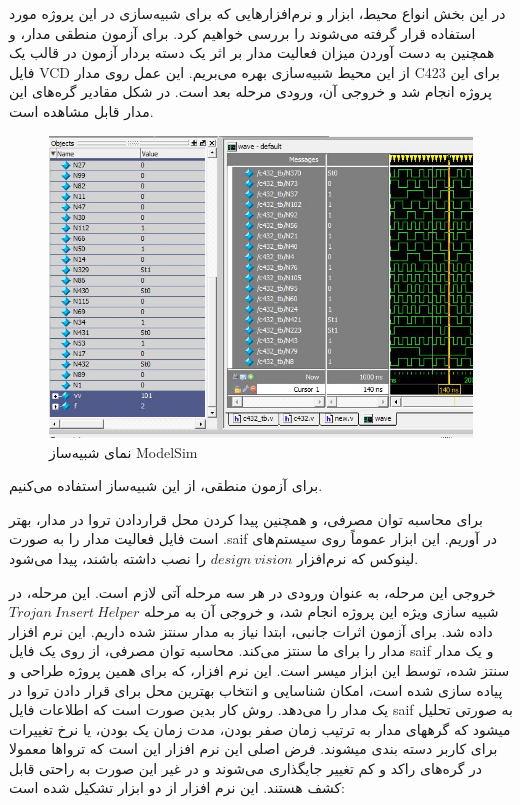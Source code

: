 در این بخش انواع محیط، ابزار و نرم‌افزارهایی که برای شبیه‌سازی در این پروژه مورد استفاده قرار گرفته می‌شوند را بررسی خواهیم کرد.
برای آزمون منطقی مدار، و همچنین به دست آوردن میزان فعالیت مدار بر اثر یک دسته بردار آزمون در قالب یک فایل VCD از این محیط شبیه‌سازی بهره می‌بریم. این عمل روی مدار C423 برای این پروژه انجام شد و خروجی آن، ورودی مرحله بعد است. در شکل مقادیر گره‌های این مدار قابل مشاهده است.
\begin{figure}[H]
\begin{center}
\includegraphics[scale=0.6]{figs/modelsim.jpg}
\caption{نمای شبیه‌ساز ModelSim} 
\label{fig1}
\end{center}
\end{figure}
برای آزمون منطقی، از این شبیه‌ساز استفاده می‌کنیم.

برای محاسبه توان مصرفی، و همچنین پیدا کردن محل قراردادن تروا در مدار، بهتر است فایل فعالیت مدار را به صورت .saif در آوریم. این ابزار عموماً روی سیستم‌های لینوکس که نرم‌افزار  $design\ vision$ را نصب داشته باشند، پیدا می‌شود.

 خروجی این مرحله، به عنوان ورودی در هر سه مرحله آتی لازم است. این مرحله، در شبیه سازی ویژه این پروژه انجام شد، و خروجی آن به مرحله $Trojan\ Insert\ Helper$ داده شد.
برای آزمون اثرات جانبی، ابتدا نیاز به مدار سنتز شده داریم. این نرم افزار مدار را برای ما سنتز می‌کند.
محاسبه توان مصرفی، از روی یک فایل saif و یک مدار سنتز شده، توسط این ابزار میسر است.
این نرم افزار، که برای همین پروژه طراحی و پیاده سازی شده است، امکان شناسایی و انتخاب بهترین محل برای قرار دادن تروا در یک مدار را می‌دهد. روش کار بدین صورت است که اطلاعات فایل saif به صورتی تحلیل میشود که گرههای مدار  به ترتیب زمان صفر بودن، مدت زمان یک بودن، یا نرخ تغییرات برای کاربر دسته بندی میشوند. فرض اصلی این نرم افزار این است که ترواها معمولا در گره‌های راکد و کم تغییر جایگذاری می‌شوند و در غیر این صورت به راحتی قابل کشف هستند. این نرم افزار از دو ابزار تشکیل شده است:


